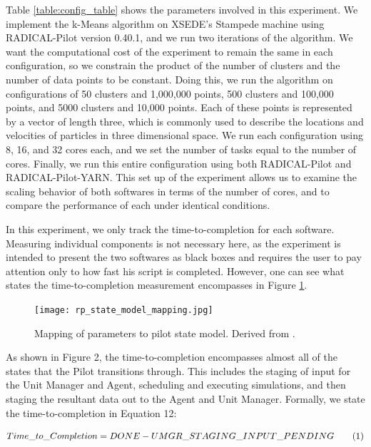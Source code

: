 \documentclass[]{article}
\newcommand\numberthis{\addtocounter{equation}{1}\tag{\theequation}}
\begin{document}
			Table \ref{table:config_table} shows the parameters involved in this experiment. We implement the k-Means algorithm on XSEDE's Stampede machine using RADICAL-Pilot version 0.40.1, and we run two iterations of the algorithm. We want the computational cost of the experiment to remain the same in each configuration, so we constrain the product of the number of clusters and the number of data points to be constant. Doing this, we run the algorithm on configurations of 50 clusters and 1,000,000 points, 500 clusters and 100,000 points, and 5000 clusters and 10,000 points. Each of these points is represented by a vector of length three, which is commonly used to describe the locations and velocities of particles in three dimensional space. We run each configuration using 8, 16, and 32 cores each, and we set the number of tasks equal to the number of cores. Finally, we run this entire configuration using both RADICAL-Pilot and RADICAL-Pilot-YARN. This set up of the experiment allows us to examine the scaling behavior of both softwares in terms of the number of cores, and to compare the performance of each under identical conditions.

			In this experiment, we only track the time-to-completion for each software. Measuring individual components is not necessary here, as the experiment is intended to present the two softwares as black boxes and requires the user to pay attention only to how fast his script is completed. However, one can see what states the time-to-completion measurement encompasses in Figure \ref{fig:pilot_state_mapping}.

			\begin{figure}[H]
				\centering
				\texttt{[image: rp\_state\_model\_mapping.jpg]}
				\caption{Mapping of parameters to pilot state model. Derived from \cite{rp_state_diagram}.}
				\label{fig:pilot_state_mapping}
			\end{figure}

			As shown in Figure 2, the time-to-completion encompasses almost all of the states that the Pilot transitions through. This includes the staging of input for the Unit Manager and Agent, scheduling and executing simulations, and then staging the resultant data out to the Agent and Unit Manager. Formally, we state the time-to-completion in Equation 12:

			\begin{align*}
				Time\_to\_Completion = DONE - UMGR\_STAGING\_INPUT\_PENDING \numberthis \label{12}
			\end{align*}
\end{document}
